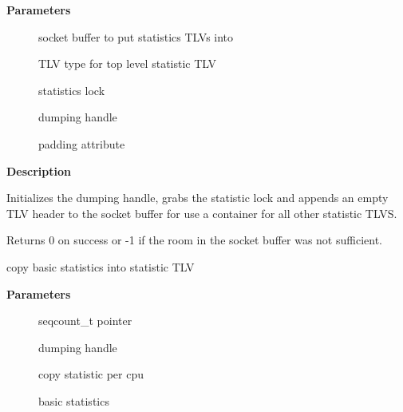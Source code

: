 \documentclass[a4paper,8pt,english]{sphinxmanual}
\begin{document}
\textbf{Parameters}
\begin{description}
\item[{}] \leavevmode
socket buffer to put statistics TLVs into

\item[{}] \leavevmode
TLV type for top level statistic TLV

\item[{}] \leavevmode
statistics lock

\item[{}] \leavevmode
dumping handle

\item[{}] \leavevmode
padding attribute

\end{description}

\textbf{Description}

Initializes the dumping handle, grabs the statistic lock and appends
an empty TLV header to the socket buffer for use a container for all
other statistic TLVS.

Returns 0 on success or -1 if the room in the socket buffer was not sufficient.

\begin{fulllineitems}
\label{networking/kapi:c.gnet_stats_copy_basic}
copy basic statistics into statistic TLV

\end{fulllineitems}


\textbf{Parameters}
\begin{description}
\item[{}] \leavevmode
seqcount\_t pointer

\item[{}] \leavevmode
dumping handle

\item[{}] \leavevmode
copy statistic per cpu

\item[{}] \leavevmode
basic statistics

\end{description}
\end{document}
